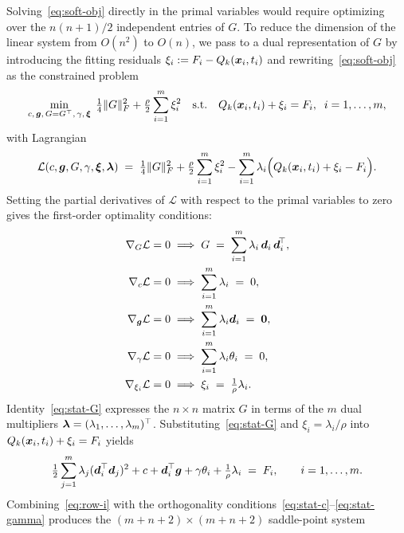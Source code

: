 Solving~\eqref{eq:soft-obj} directly in the primal variables would require optimizing over the $n(n+1)/2$ independent entries of $G$. To reduce the dimension of the linear system from $O(n^2)$ to $O(n)$, we pass to a dual representation of $G$ by introducing the fitting residuals $\xi_i := F_i - Q_k(\boldsymbol{x}_i, t_i)$ and rewriting~\eqref{eq:soft-obj} as the constrained problem
\begin{equation*}
  \min_{c,\,\boldsymbol{g},\,G=G^\top,\,\gamma,\,\boldsymbol{\xi}}\;
  \tfrac{1}{4}\|G\|_F^2 + \tfrac{\rho}{2}\sum_{i=1}^m \xi_i^2
  \quad \text{s.t.} \quad Q_k(\boldsymbol{x}_i, t_i) + \xi_i = F_i, \;\; i = 1, \dots, m,
\end{equation*}
with Lagrangian
\begin{equation*}
  \mathcal{L}(c, \boldsymbol{g}, G, \gamma, \boldsymbol{\xi}, \boldsymbol{\lambda})
  \;=\;
  \tfrac{1}{4}\|G\|_F^2 + \tfrac{\rho}{2}\sum_{i=1}^m \xi_i^2
  - \sum_{i=1}^m \lambda_i \Bigl(Q_k(\boldsymbol{x}_i, t_i) + \xi_i - F_i\Bigr).
\end{equation*}
Setting the partial derivatives of $\mathcal{L}$ with respect to the primal variables to zero gives the first-order optimality conditions:
\begin{align}
  \nabla_G \mathcal{L} = 0 &\implies G \;=\; \sum_{i=1}^m \lambda_i\,\boldsymbol{d}_i\,\boldsymbol{d}_i^{\!\top}, \label{eq:stat-G} \\
  \nabla_c \mathcal{L} = 0 &\implies \sum_{i=1}^m \lambda_i \;=\; 0, \label{eq:stat-c} \\
  \nabla_{\boldsymbol{g}} \mathcal{L} = 0 &\implies \sum_{i=1}^m \lambda_i \boldsymbol{d}_i \;=\; \boldsymbol{0}, \label{eq:stat-g} \\
  \nabla_\gamma \mathcal{L} = 0 &\implies \sum_{i=1}^m \lambda_i \theta_i \;=\; 0, \label{eq:stat-gamma} \\
  \nabla_{\xi_i} \mathcal{L} = 0 &\implies \xi_i \;=\; \tfrac{1}{\rho}\lambda_i. \nonumber
\end{align}
Identity~\eqref{eq:stat-G} expresses the $n\times n$ matrix $G$ in terms of the $m$ dual multipliers $\boldsymbol{\lambda} = (\lambda_1, \dots, \lambda_m)^\top$. Substituting~\eqref{eq:stat-G} and $\xi_i = \lambda_i/\rho$ into $Q_k(\boldsymbol{x}_i, t_i) + \xi_i = F_i$ yields
\begin{equation}\label{eq:row-i}
  \tfrac{1}{2}\sum_{j=1}^m \lambda_j (\boldsymbol{d}_i^\top \boldsymbol{d}_j)^2 + c + \boldsymbol{d}_i^\top \boldsymbol{g} + \gamma \theta_i + \tfrac{1}{\rho}\lambda_i \;=\; F_i,
  \qquad i = 1, \dots, m.
\end{equation}
Combining~\eqref{eq:row-i} with the orthogonality conditions~\eqref{eq:stat-c}--\eqref{eq:stat-gamma} produces the $(m+n+2)\times(m+n+2)$ saddle-point system
